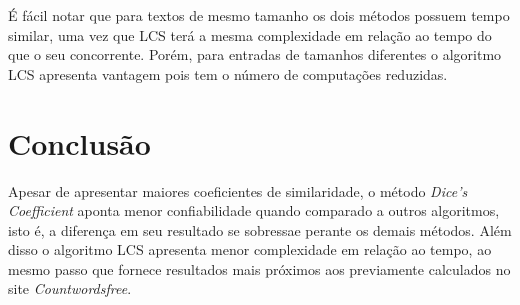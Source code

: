 \documentclass[12pt]{article}
\begin{document}
É fácil notar que para textos de mesmo tamanho os dois métodos possuem tempo similar, uma vez que LCS terá a mesma complexidade em relação ao tempo do que o seu concorrente. Porém, para entradas de tamanhos diferentes o algoritmo LCS apresenta vantagem pois tem o número de computações reduzidas.

\section{Conclusão}

Apesar de apresentar maiores coeficientes de similaridade, o método \textit{Dice's Coefficient} aponta menor confiabilidade quando comparado a outros algoritmos, isto é, a diferença em seu resultado se sobressae perante os demais métodos. Além disso o algoritmo LCS apresenta menor complexidade em relação ao tempo, ao mesmo passo que fornece resultados mais próximos aos previamente calculados no site \textit{Countwordsfree}.



\end{document}

